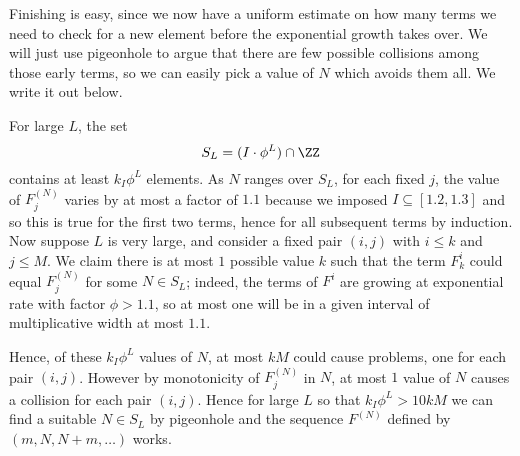 Finishing is easy, since we now have a uniform estimate on how many
terms we need to check for a new element before the exponential growth
takes over. We will just use pigeonhole to argue that there are few
possible collisions among those early terms, so we can easily pick a
value of $N$ which avoids them all. We write it out below.

For large $L$, the set \[S_L=(I\cdot \phi^L)\cap\ZZ\] contains at
least $k_I\phi^L$ elements. As $N$ ranges over $S_L$, for each fixed
$j$, the value of $F^{(N)}_j$ varies by at most a factor of $1.1$
because we imposed $I\subseteq [1.2,1.3]$ and so this is true for the
first two terms, hence for all subsequent terms by induction. Now
suppose $L$ is very large, and consider a fixed pair $(i,j)$ with $i\leq
k$ and $j\leq M$. We claim there is at most $1$ possible value $k$ such
that the term $F^i_k$ could equal $F^{(N)}_j$ for some $N\in S_L$;
indeed, the terms of $F^i$ are growing at exponential rate with factor
$\phi>1.1$, so at most one will be in a given interval of multiplicative
width at most $1.1$.

Hence, of these $k_I\phi^L$ values of $N$, at most $kM$ could cause
problems, one for each pair $(i,j)$. However by monotonicity of
$F^{(N)}_j$ in $N$, at most $1$ value of $N$ causes a collision for each
pair $(i,j)$. Hence for large $L$ so that $k_I\phi^L>10kM$ we can find a
suitable $N\in S_L$ by pigeonhole and the sequence $F^{(N)}$ defined by
$(m,N,N+m,\dots)$ works.
